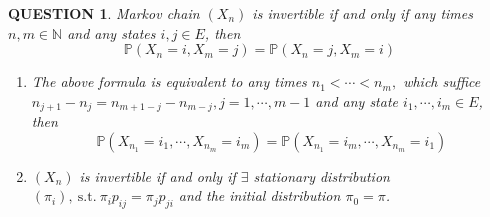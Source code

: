 \documentclass[12pt]{article}
\renewcommand{\(}{\left(}%
\renewcommand{\)}{\right)}%
\renewcommand{\[}{\left[}%
\renewcommand{\]}{\right]}%
\newcommand{\p}{\mathbb{P}}
\newcommand{\n}{\mathbb{N}}
\newcommand{\st}{\mathrm{\ s.t.\ }}
\newtheorem{question}{QUESTION}[section]}
\begin{document}
 \begin{question}
  Markov chain $(X_n)$ is invertible if and only if any times $ n,m\in\n$ and any states $i,j\in E$, then
  \begin{equation*}
   \p(X_n=i,X_m=j)=\p(X_n=j,X_m=i)
  \end{equation*}
  \begin{enumerate}
   \item The above formula is equivalent to any times $n_1<\cdots<n_m,$ which suffice $n_{j+1}-n_j=n_{m+1-j}-n_{m-j},j=1,\cdots,m-1$ and any state $i_1,\cdots,i_m\in E$, then
   \begin{equation*}
    \p(X_{n_1}=i_1,\cdots,X_{n_m}=i_m )=\p(X_{n_1}=i_m,\cdots,X_{n_m}=i_1 )
   \end{equation*}
   \item $(X_n)$ is invertible if and only if $\exists $  stationary distribution  $(\pi_i),\st \pi_ip_{ij}=\pi_jp_{ji}$ and the initial distribution $\pi_0=\pi$.
  \end{enumerate}
 \end{question}
\end{document}
